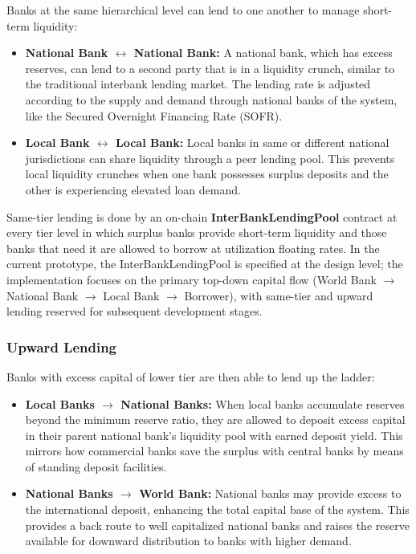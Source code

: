\documentclass[12pt,a4paper]{report}
\begin{document}
Banks at the same hierarchical level can lend to one another to manage short-term liquidity:

\begin{itemize}[noitemsep]
\item \textbf{National Bank $\leftrightarrow$ National Bank:} A national bank, which has excess reserves, can lend to a second party that is in a liquidity crunch, similar to the traditional interbank lending market. The lending rate is adjusted according to the supply and demand through national banks of the system, like the Secured Overnight Financing Rate (SOFR).
\item \textbf{Local Bank $\leftrightarrow$ Local Bank:} Local banks in same or different national jurisdictions can share liquidity through a peer lending pool. This prevents local liquidity crunches when one bank possesses surplus deposits and the other is experiencing elevated loan demand.
\end{itemize}

Same-tier lending is done by an on-chain \textbf{InterBankLendingPool} contract at every tier level in which surplus banks provide short-term liquidity and those banks that need it are allowed to borrow at utilization floating rates. In the current prototype, the InterBankLendingPool is specified at the design level; the implementation focuses on the primary top-down capital flow (World Bank $\to$ National Bank $\to$ Local Bank $\to$ Borrower), with same-tier and upward lending reserved for subsequent development stages.

\subsubsection{Upward Lending}

Banks with excess capital of lower tier are then able to lend up the ladder:

\begin{itemize}[noitemsep]
\item \textbf{Local Banks $\to$ National Banks:} When local banks accumulate reserves beyond the minimum reserve ratio, they are allowed to deposit excess capital in their parent national bank's liquidity pool with earned deposit yield. This mirrors how commercial banks save the surplus with central banks by means of standing deposit facilities.
\item \textbf{National Banks $\to$ World Bank:} National banks may provide excess to the international deposit, enhancing the total capital base of the system. This provides a back route to well capitalized national banks and raises the reserve available for downward distribution to banks with higher demand.
\end{itemize}
\end{document}
